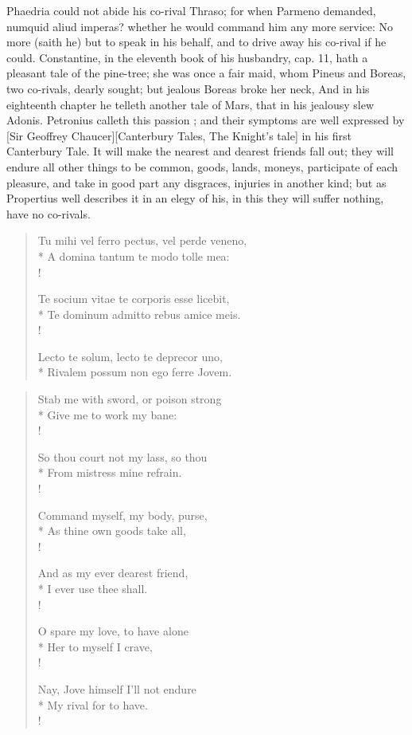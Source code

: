 Phaedria could not abide his co-rival Thraso; for when Parmeno
demanded, numquid aliud imperas? whether he would command him any more
service: No more (saith he) but to speak in his behalf, and to drive
away his co-rival if he could. Constantine, in the eleventh book of his
husbandry, cap. 11, hath a pleasant tale of the pine-tree; she
was once a fair maid, whom Pineus and Boreas, two co-rivals, dearly
sought; but jealous Boreas broke her neck, \etc{} And in his eighteenth
chapter he telleth another tale of Mars, that in his jealousy
slew Adonis. Petronius calleth this passion ; and their symptoms are well expressed by [Sir Geoffrey Chaucer][Canterbury Tales, The Knight's tale] in his first Canterbury Tale. It will
make the nearest and dearest friends fall out; they will endure all
other things to be common, goods, lands, moneys, participate of each
pleasure, and take in good part any disgraces, injuries in another
kind; but as Propertius well describes it in an elegy of his, in this
they will suffer nothing, have no co-rivals.
%
\begin{latin}%
\begin{verse}%
Tu mihi vel ferro pectus, vel perde veneno,\\*
A domina tantum te modo tolle mea:\\!

Te socium vitae te corporis esse licebit,\\*
Te dominum admitto rebus amice meis.\\!

Lecto te solum, lecto te deprecor uno,\\*
Rivalem possum non ego ferre Jovem.
\end{verse}%
\end{latin}%
\translationrule%
\begin{verse}%
Stab me with sword, or poison strong\\*
Give me to work my bane:\\!

So thou court not my lass, so thou\\*
From mistress mine refrain.\\!

Command myself, my body, purse,\\*
As thine own goods take all,\\!

And as my ever dearest friend,\\*
I ever use thee shall.\\!

O spare my love, to have alone\\*
Her to myself I crave,\\!

Nay, Jove himself I'll not endure\\*
My rival for to have.\\!
\end{verse}%
%

